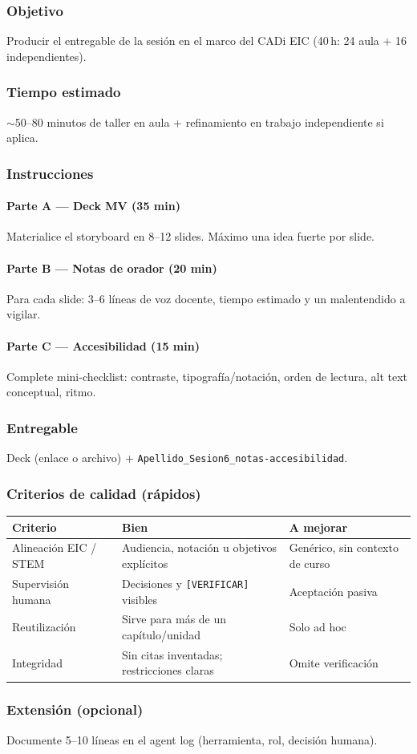\subsubsection*{Objetivo}
Producir el entregable de la sesión en el marco del CADi EIC (40\,h: 24 aula + 16 independientes).

\subsubsection*{Tiempo estimado}
$\sim$50--80 minutos de taller en aula + refinamiento en trabajo independiente si aplica.

\subsubsection*{Instrucciones}
\paragraph{Parte A --- Deck MV (35 min)} Materialice el storyboard en 8--12 slides. Máximo una idea fuerte por slide.
\paragraph{Parte B --- Notas de orador (20 min)} Para cada slide: 3--6 líneas de voz docente, tiempo estimado y un malentendido a vigilar.
\paragraph{Parte C --- Accesibilidad (15 min)} Complete mini-checklist: contraste, tipografía/notación, orden de lectura, alt text conceptual, ritmo.

\subsubsection*{Entregable}
Deck (enlace o archivo) + \texttt{Apellido\_Sesion6\_notas-accesibilidad}.

\subsubsection*{Criterios de calidad (rápidos)}
\begin{tabularx}{\textwidth}{@{}lXX@{}}
\toprule
Criterio & Bien & A mejorar \\
\midrule
Alineación EIC / STEM & Audiencia, notación u objetivos explícitos & Genérico, sin contexto de curso \\
Supervisión humana & Decisiones y \texttt{[VERIFICAR]} visibles & Aceptación pasiva \\
Reutilización & Sirve para más de un capítulo/unidad & Solo ad hoc \\
Integridad & Sin citas inventadas; restricciones claras & Omite verificación \\
\bottomrule
\end{tabularx}

\subsubsection*{Extensión (opcional)}
Documente 5--10 líneas en el agent log (herramienta, rol, decisión humana).
